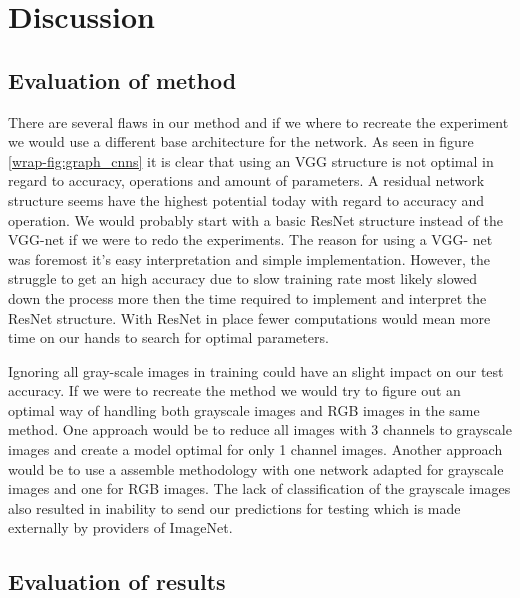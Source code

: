 \documentclass{kthreport}
\begin{document}









\clearpage
\section{Discussion}
\label{sec:Discussion}

\subsection{Evaluation of method}

There are several flaws in our method and if we where to recreate the experiment we would use a different base architecture for the network.
As seen in figure \ref{wrap-fig:graph_cnns} it is clear that using an VGG structure is not optimal in regard to accuracy, operations and amount of parameters.
A residual network structure seems have the highest potential today with regard to accuracy and operation.
We would probably start with a basic ResNet structure instead of the VGG-net if we were to redo the experiments.
The reason for using a VGG- net was foremost it's easy interpretation and simple implementation. However, the struggle to get an high accuracy due to slow training rate most likely slowed down the process more then the time required to implement and interpret the ResNet structure.
With ResNet in place fewer computations would mean more time on our hands to search for optimal parameters.

Ignoring all gray-scale images in training could have an slight impact on our test accuracy. If we were to recreate the method we would try to figure out an optimal way of handling both grayscale images and RGB images in the same method. One approach would be to reduce all images with 3 channels to grayscale images and create a model optimal for only 1 channel images. Another approach would be to use a assemble methodology with one network adapted for grayscale images and one for RGB images. The lack of classification of the grayscale images also resulted in inability to send our predictions for testing which is made externally by providers of ImageNet.

\subsection{Evaluation of results}
\end{document}
